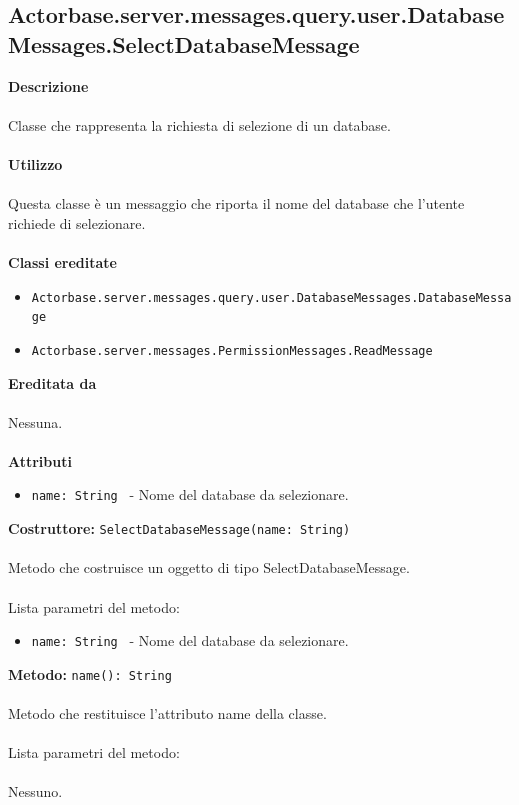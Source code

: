 \documentclass[a4paper]{article}
\begin{document}
	\subsection{Actorbase.server.messages.query.user.DatabaseMessages.SelectDatabaseMessage}
		\textbf{Descrizione}
			\\ \\
		Classe che rappresenta la richiesta di selezione di un database.
			\\ \\
		\textbf{Utilizzo}
			\\ \\
		Questa classe è un messaggio che riporta il nome del database che l'utente richiede di selezionare.
			\\ \\
		\textbf{Classi ereditate}
			\begin{itemize}
				\item \texttt{Actorbase.server.messages.query.user.DatabaseMessages.DatabaseMessage }
				\item \texttt{Actorbase.server.messages.PermissionMessages.ReadMessage }
			\end{itemize}
		\textbf{Ereditata da}
			\\ \\
			Nessuna.
			\\ \\
		\textbf{Attributi}
			\begin{itemize}
				\item \texttt{name: String } - Nome del database da selezionare.
			\end{itemize}
		\textbf{Costruttore: }\texttt{SelectDatabaseMessage(name: String)}
			\\ \\
		Metodo che costruisce un oggetto di tipo SelectDatabaseMessage.
			\\ \\
		Lista parametri del metodo:
			\begin{itemize}
				\item \texttt{name: String } - Nome del database da selezionare.
			\end{itemize}
		\textbf{Metodo: }\texttt{name(): String}
			\\ \\
		Metodo che restituisce l'attributo name della classe.
			\\ \\
		Lista parametri del metodo:
			\\ \\
			Nessuno.			
			
\end{document}
